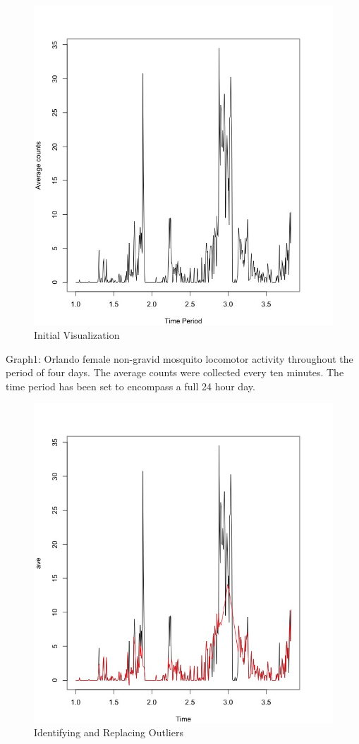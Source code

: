 \documentclass[]{article}
\begin{document}
\begin{figure}
\centering
\includegraphics{VisualizeFP.jpeg}
\caption{Initial Visualization}
\end{figure}

Graph1: Orlando female non-gravid mosquito locomotor activity throughout
the period of four days. The average counts were collected every ten
minutes. The time period has been set to encompass a full 24 hour day.

\begin{figure}
\centering
\includegraphics{RemoveOutliersFP.jpeg}
\caption{Identifying and Replacing Outliers}
\end{figure}
\end{document}
